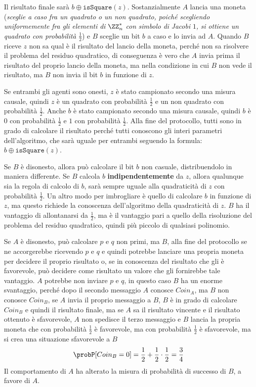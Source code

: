 Il risultato finale sarà $b \oplus \texttt{isSquare}(z)$. Sostanzialmente 
$A$ lancia una moneta (\textit{sceglie a caso fra un quadrato o un non quadrato, poiché 
scegliendo uniformemente fra gli elementi di $\ZZ_n^*$ con simbolo 
di Jacobi $1$, si ottiene un quadrato con probabilità $\frac{1}{2}$}) e
$B$ sceglie un bit $b$ a caso e lo invia ad $A$. Quando $B$ riceve $z$ non 
sa qual è il risultato del lancio della moneta, perché non sa risolvere il 
problema del residuo quadratico, di conseguenza è vero che $A$ invia prima 
il risultato del proprio lancio della moneta, ma nella condizione in cui $B$ non 
vede il risultato, ma $B$ non invia il bit $b$ in funzione di $z$.

Se entrambi gli agenti sono onesti, $z$ è stato campionato secondo 
una misura causale, quindi $z$ è un quadrato con probabilità $\frac{1}{2}$ 
e un non quadrato con probabilità $\frac{1}{2}$. Anche $b$ è stato
campionato secondo una misura causale, quindi $b$ è $0$ con probabilità
$\frac{1}{2}$ e $1$ con probabilità $\frac{1}{2}$. Alla fine del protocollo,
tutti sono in grado di calcolare il risultato perché tutti conoscono 
gli interi parametri dell'algoritmo, che sarà uguale per entrambi seguendo la
formula: $b \oplus \texttt{isSquare}(z)$.

Se $B$ è disonesto, allora può calcolare il bit $b$ non casuale, distribuendolo
in maniera differente. Se $B$ calcola $b$ \textbf{indipendentemente} da 
$z$, allora qualunque sia la regola di calcolo di $b$, sarà sempre 
uguale alla quadraticità di $z$ con probabilità $\frac{1}{2}$. Un altro modo 
per imbrogliare è quello di calcolare $b$ in funzione di $z$, ma 
questo richiede la conoscenza dell'algoritmo della quadraticità di $z$.
$B$ ha il vantaggio di allontanarsi da $\frac{1}{2}$, ma è il vantaggio 
pari a quello della risoluzione del problema del residuo quadratico, quindi 
più piccolo di qualsiasi polinomio.

Se $A$ è disonesto, può calcolare $p$ e $q$ non primi, ma $B$, alla fine del 
protocollo se ne accorgerebbe ricevendo $p$ e $q$ e quindi potrebbe
lanciare una propria moneta per decidere il proprio risultato o, se in conoscenza 
del risultato che gli è favorevole, può decidere come risultato un valore che gli 
fornirebbe tale vantaggio. 
$A$ potrebbe non inviare $p$ e $q$, in questo caso $B$ ha un enorme 
svantaggio, perché dopo il secondo messaggio $A$ conosce $Coin_A$, ma 
$B$ non conosce $Coin_B$, se $A$ invia il proprio messaggio a $B$, $B$ 
è in grado di calcolare $Coin_B$ e quindi il risultato finale, ma se $A$
sa il risultato vincente e il risultato ottenuto è sfavorevole, $A$ non 
spedisce il terzo messaggio e $B$ lancia la propria moneta che con probabilità 
$\frac{1}{2}$ è favorevole, ma con probabilità $\frac{1}{2}$ è sfavorevole,
ma si crea una situazione sfavorevole a $B$
\[
  \probP[Coin_B = 0] = \frac{1}{2} + \frac{1}{2} \cdot \frac{1}{2} = \frac{3}{4}
\]
Il comportamento di $A$ ha alterato la misura di probabilità di successo di $B$, a 
favore di $A$.

